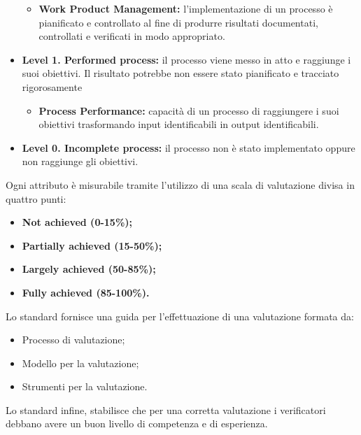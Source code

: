 \begin{itemize}
\begin{itemize}
					\item \textbf{Work Product Management:} l'implementazione di un processo è pianificato e controllato al fine di produrre risultati documentati, controllati e verificati in modo appropriato.
				\end{itemize}			
			\item \textbf{Level 1. Performed process:} il processo viene messo in atto e raggiunge i suoi obiettivi. Il risultato potrebbe non essere stato pianificato e tracciato rigorosamente
				\begin{itemize}
					\item \textbf{Process Performance:} capacità di un processo di raggiungere i suoi obiettivi trasformando input identificabili in output identificabili.
				\end{itemize}
			\item \textbf{Level 0. Incomplete process:} il processo non è stato implementato oppure non raggiunge gli obiettivi.
		\end{itemize}
	Ogni attributo è misurabile tramite l'utilizzo di una scala di valutazione divisa in quattro punti:
		\begin{itemize}
			\item \textbf{Not achieved (0-15\%);}
			\item \textbf{Partially achieved (15-50\%);}
			\item \textbf{Largely achieved (50-85\%);}
			\item \textbf{Fully achieved (85-100\%).}
		\end{itemize}
	Lo standard fornisce una guida per l'effettuazione di una valutazione formata da:
		\begin{itemize}
			\item Processo di valutazione;
			\item Modello per la valutazione;
			\item Strumenti per la valutazione.
		\end{itemize}
	Lo standard infine, stabilisce che per una corretta valutazione i verificatori debbano avere un buon livello di competenza e di esperienza.
	
